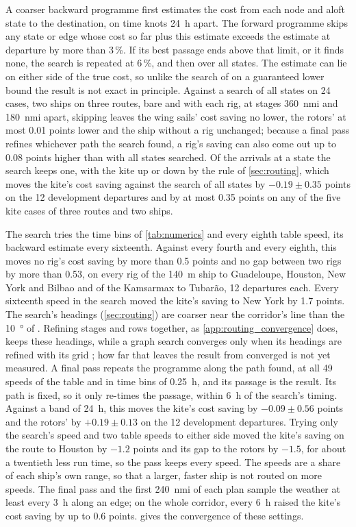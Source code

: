 A coarser backward programme first estimates the cost from each node and aloft state to the destination, on time knots \SI{24}{h} apart. The forward programme skips any state or edge whose cost so far plus this estimate exceeds the estimate at departure by more than 3\,\%. If its best passage ends above that limit, or it finds none, the search is repeated at 6\,\%, and then over all states. The estimate can lie on either side of the true cost, so unlike the search of \citet{gangnant2026} on a guaranteed lower bound the result is not exact in principle. Against a search of all states on 24 cases, two ships on three routes, bare and with each rig, at stages \SI{360}{nmi} and \SI{180}{nmi} apart, skipping leaves the wing sails' cost saving no lower, the rotors' at most 0.01 points lower and the ship without a rig unchanged; because a final pass refines whichever path the search found, a rig's saving can also come out up to 0.08 points higher than with all states searched. Of the arrivals at a state the search keeps one, with the kite up or down by the rule of \cref{sec:routing}, which moves the kite's cost saving against the search of all states by $-0.19 \pm 0.35$ points on the 12 development departures and by at most 0.35 points on any of the five kite cases of three routes and two ships.

The search tries the time bins of \cref{tab:numerics} and every eighth table speed, its backward estimate every sixteenth. Against every fourth and every eighth, this moves no rig's cost saving by more than 0.5 points and no gap between two rigs by more than 0.53, on every rig of the \SI{140}{m} ship to Guadeloupe, Houston, New York and Bilbao and of the Kamsarmax to Tubarão, 12 departures each. Every sixteenth speed in the search moved the kite's saving to New York by 1.7 points. The search's headings (\cref{sec:routing}) are coarser near the corridor's line than the \SI{10}{\degree} of \citet{hagiwara1989}. Refining stages and rows together, as \cref{app:routing_convergence} does, keeps these headings, while a graph search converges only when its headings are refined with its grid \citep{mannarini2020}; how far that leaves the result from converged is not yet measured. A final pass repeats the programme along the path found, at all 49 speeds of the table and in time bins of \SI{0.25}{h}, and its passage is the result. Its path is fixed, so it only re-times the passage, within \SI{6}{h} of the search's timing. Against a band of \SI{24}{h}, this moves the kite's cost saving by $-0.09 \pm 0.56$ points and the rotors' by $+0.19 \pm 0.13$ on the 12 development departures. Trying only the search's speed and two table speeds to either side moved the kite's saving on the route to Houston by $-1.2$ points and its gap to the rotors by $-1.5$, for about a twentieth less run time, so the pass keeps every speed. The speeds are a share of each ship's own range, so that a larger, faster ship is not routed on more speeds. The final pass and the first \SI{240}{nmi} of each plan sample the weather at least every \SI{3}{h} along an edge; on the whole corridor, every \SI{6}{h} raised the kite's cost saving by up to 0.6 points.  gives the convergence of these settings.

